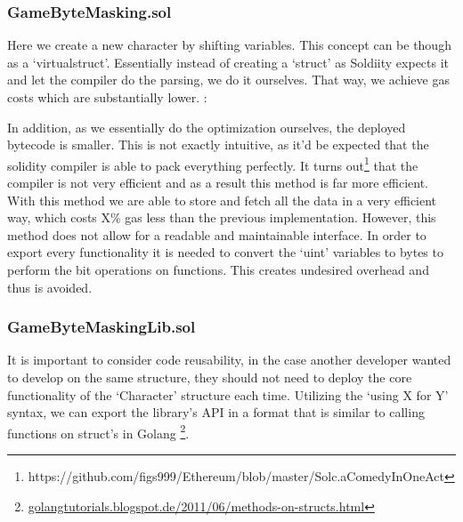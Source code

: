 % 

\subsubsection{GameByteMasking.sol}

Here we create a new character by shifting variables. This concept can be though as a `virtualstruct'. Essentially instead of creating a `struct' as Soldiity expects it and let the compiler do the parsing, we do it ourselves. That way, we achieve gas costs which are substantially lower.
% 
:

In addition, as we essentially do the optimization ourselves, the deployed bytecode is smaller. 
This is not exactly intuitive, as it'd be expected that the solidity compiler is able to pack everything perfectly. It turns out\footnote{https://github.com/figs999/Ethereum/blob/master/Solc.aComedyInOneAct} that the compiler is not very efficient and as a result this method is far more efficient. With this method we are able to store and fetch all the data in a very efficient way, which costs X\% gas less than the previous implementation. However, this method does not allow for a readable and maintainable interface. In order to export every functionality it is needed to convert the `uint' variables to bytes to perform the bit operations on functions. This creates undesired overhead and thus is avoided.

\subsubsection{GameByteMaskingLib.sol}
It is important to consider code reusability, in the case another developer wanted to develop on the same structure, they should not need to deploy the core functionality of the `Character' structure each time. Utilizing the `using X for Y' syntax, we can export the library's API in a format that is similar to calling functions on struct's in Golang \footnote{\url{ golangtutorials.blogspot.de/2011/06/methods-on-structs.html}}.

